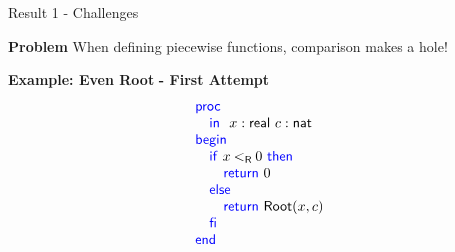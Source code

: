 \begin{frame}{Result 1 - Challenges}
    \begin{minipage}[t]{0.4\linewidth}
        \vspace{-2em}
        \begin{exampleblock}{\color{BrickRed}\textbf{Problem}}
            When defining piecewise functions, comparison makes a hole! 
        \end{exampleblock}
        \pause
        \vspace{0.75em}
        {\textbf{\color{Mahogany}Example: Even Root} \pause \textbf{\color{BrickRed} - First Attempt}\\}
        \footnotesize
        \vspace{-1em}
        \[ 
            \BLOCK{
            \PROC  \\
                \INDENT{
                \IN\ x:\real\ c:\nat}\\
            \BEGIN \\
                \INDENT{
                \IF x \realLess 0 \THEN \\
                    \INDENT{
                    \RETURN 0}\\
                \ELSE \\
                    \INDENT{
                    \RETURN \mathsf{Root}(x,c)}\\
                \FI \\

                }\\
            \END}\\
        \] 
        \pause
        \begin{flushright}
            \vspace{-3em}
            \pause
            
        \end{flushright}
    \end{minipage}
    \begin{minipage}[t]{0.50\linewidth}
      
              
    \end{minipage}

\end{frame}


